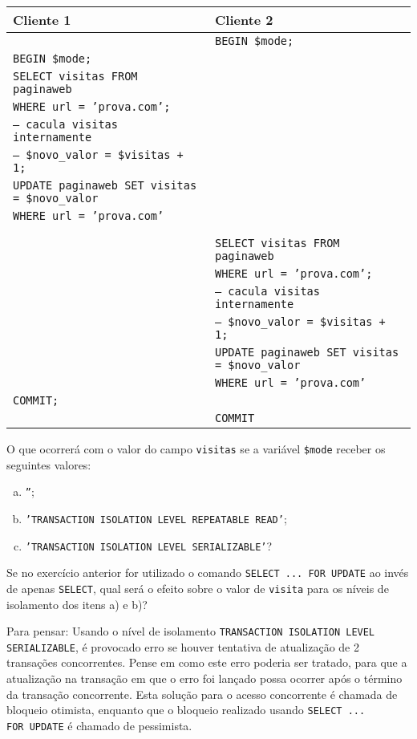 \begin{center}
\begin{tabular}{l|l}\hline
\bf \hfil Cliente 1 &\bf Cliente 2 \\\hline
 & \tt BEGIN \$mode; \\
 \tt BEGIN \$mode; & \\
\tt SELECT visitas FROM paginaweb & \\
\tt WHERE url = 'prova.com'; & \\
\tt -- cacula visitas internamente & \\
\tt -- \$novo\_valor = \$visitas + 1; & \\
\tt UPDATE paginaweb SET visitas = \$novo\_valor &\\
\tt WHERE url = 'prova.com' & \\
 & \\
 & \\
&\tt SELECT visitas FROM paginaweb  \\
&\tt WHERE url = 'prova.com';  \\
&\tt -- cacula visitas internamente  \\
&\tt -- \$novo\_valor = \$visitas + 1;  \\
 & \tt UPDATE paginaweb SET visitas = \$novo\_valor \\
 & \tt WHERE url = 'prova.com'  \\
\tt COMMIT; &\\
 &\tt COMMIT \\\hline
\end{tabular}
\end{center}

O que ocorrerá com o valor do campo {\tt visitas} se a variável
{\tt \$mode} receber os seguintes valores:

\begin{enumerate}[a)]
\item {\tt ''};
\item {\tt 'TRANSACTION ISOLATION LEVEL REPEATABLE READ'};
\item {\tt 'TRANSACTION ISOLATION LEVEL SERIALIZABLE'}?
\end{enumerate}

 Se no exercício anterior for utilizado o comando
{\tt SELECT ... FOR UPDATE} ao invés de apenas {\tt SELECT}, qual
será o efeito sobre o valor de {\tt visita} para os níveis de isolamento
dos itens a) e b)?

\vfil Para pensar: Usando o nível de isolamento {\tt TRANSACTION ISOLATION LEVEL SERIALIZABLE}, 
é provocado erro se houver tentativa de atualização de 2 transações
concorrentes.  Pense em como este erro poderia ser tratado, para que a
atualização na transação em que o erro foi lançado possa ocorrer após
o término da transação concorrente. Esta solução para o acesso
concorrente é chamada de bloqueio otimista, enquanto que o bloqueio
realizado usando {\tt SELECT ... FOR~UPDATE} é chamado de pessimista.



